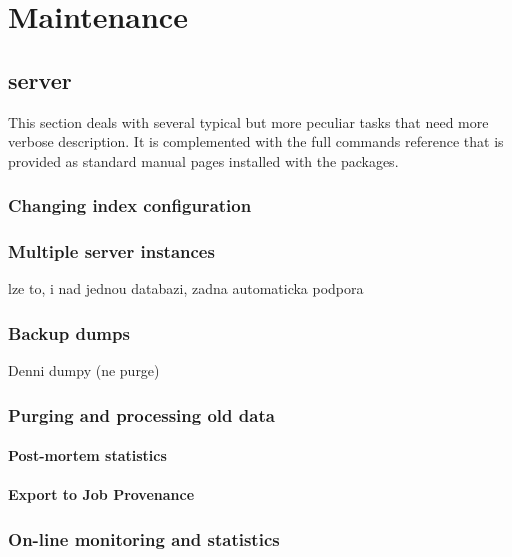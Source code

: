 \section{Maintenance}

\subsection{\LB server}

This section deals with several typical but more peculiar tasks
that need more verbose description.
It is complemented with the full commands reference that is provided
as standard manual pages installed with the \LB packages.

\subsubsection{Changing index configuration}


\subsubsection{Multiple server instances}

lze to, i nad jednou databazi, zadna automaticka podpora

\subsubsection{Backup dumps}

Denni dumpy (ne purge)

\subsubsection{Purging and processing old data}


\paragraph{Post-mortem statistics}

\paragraph{Export to Job Provenance}

\subsubsection{On-line monitoring and statistics}

